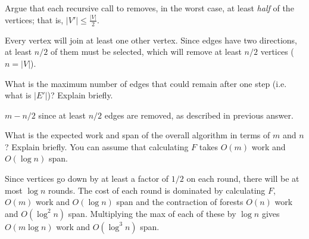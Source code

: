 \begin{problem}[4.]
\ask
Argue that each recursive call to  removes, in the worst
case, at least \emph{half} of the vertices; that is, $|V'| \leq \frac{|V|}{2}$.

\sol
Every vertex will join at least one other vertex. Since edges have
two directions, at least $n/2$ of them must be selected, which will remove
at least $n/2$ vertices ($n = |V|$).
\end{problem}

\begin{problem}[4.]
\ask
What is the maximum number of edges that could remain after one step
(i.e. what is $|E'|$)? Explain briefly.

\sol
$m - n/2$ since at least $n/2$ edges are removed, as described in
previous answer.
\end{problem}

\begin{problem}[5.]
\ask
What is the expected work and span of the overall algorithm in terms of
$m$ and $n$? Explain briefly. You can assume that calculating $F$ takes
$O(m)$ work and $O(\log n)$ span.

\sol
Since vertices go down by at least a factor of $1/2$ on each round,
there will be at most $\log n$ rounds.  The cost of each round is
dominated by calculating $F$, $O(m)$ work and $O(\log n)$ span and the
contraction of forests $O(n)$ work and $O(\log^2 n)$ span.
Multiplying the max of each of these by $\log n$ gives $O(m \log n)$ work
and $O(\log^3 n)$ span.
\end{problem}

